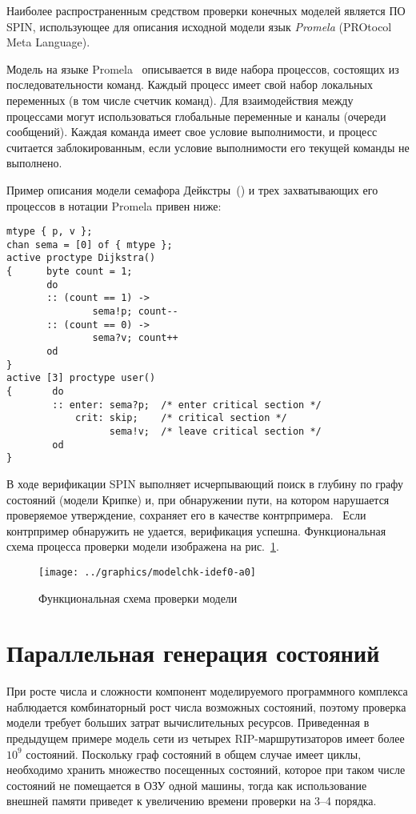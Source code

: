 \documentclass[12pt,a4paper,fleqn]{article}
\begin{document}
Наиболее распространенным средством проверки конечных моделей является ПО SPIN, использующее для описания исходной
модели язык \emph{Promela} (PROtocol Meta Language).~\cite{SpinRoot}

Модель на языке Promela~ описывается в виде набора процессов, состоящих из последовательности команд. Каждый процесс
имеет свой набор локальных переменных (в том числе счетчик команд). Для взаимодействия между процессами могут
использоваться глобальные переменные и каналы (очереди сообщений). Каждая команда имеет свое условие выполнимости, и
процесс считается заблокированным, если условие выполнимости его текущей команды не выполнено.

Пример описания модели семафора Дейкстры~(\cite{SPIN}) и трех захватывающих его процессов в нотации Promela привен ниже:

\begin{lstlisting}[language=Promela]
mtype { p, v };
chan sema = [0] of { mtype };
active proctype Dijkstra()
{      byte count = 1;
       do
       :: (count == 1) ->
               sema!p; count--
       :: (count == 0) ->
               sema?v; count++
       od
}
active [3] proctype user()
{       do
        :: enter: sema?p;  /* enter critical section */
            crit: skip;    /* critical section */
                  sema!v;  /* leave critical section */
        od
}  
\end{lstlisting}

В ходе верификации SPIN выполняет исчерпывающий поиск в глубину по графу состояний (модели Крипке) и, при обнаружении
пути, на котором нарушается проверяемое утверждение, сохраняет его в качестве контрпримера.~\cite{Clarke} Если
контрпример обнаружить не удается, верификация успешна. Функциональная схема процесса проверки модели изображена на
рис.~\ref{fig:modelchk-idef0-a0}.

\begin{figure}[ht]
  \centering
  \texttt{[image: ../graphics/modelchk-idef0-a0]}
  \caption{Функциональная схема проверки модели}
  \label{fig:modelchk-idef0-a0}
\end{figure}

\section{Параллельная генерация состояний}
\label{sec:pargen}

При росте числа и сложности компонент моделируемого программного комплекса наблюдается комбинаторный рост числа
возможных состояний, поэтому проверка модели требует больших затрат вычислительных ресурсов. Приведенная в предыдущем
примере модель сети из четырех RIP-маршрутизаторов имеет более $10^9$ состояний. Поскольку граф состояний в общем случае
имеет циклы, необходимо хранить множество посещенных состояний, которое при таком числе состояний не помещается в ОЗУ
одной машины, тогда как использование внешней памяти приведет к увеличению времени проверки на 3--4 порядка.
\end{document}
